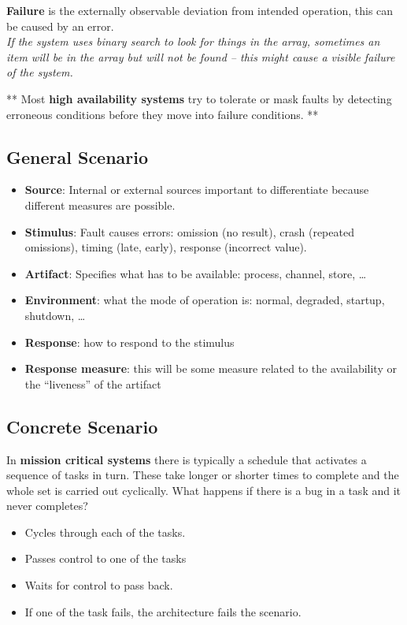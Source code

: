 \documentclass[a4paper]{article}
\begin{document}
\textbf{Failure} is the externally observable deviation from intended operation, this can be caused by an error.\\
\textit{If the system uses binary search to look for things in the array, sometimes an item will be in the array but will not be found – this might cause a visible failure  of the system.}


** Most \textbf{high availability systems} try to tolerate or mask faults by detecting erroneous conditions before they move into failure conditions. **


\subsection{General Scenario}

\begin{itemize}
\item{\textbf{Source}: Internal or external sources important to differentiate because different measures are possible.}
\item{\textbf{Stimulus}: Fault causes errors: omission (no result), crash (repeated omissions), timing (late, early), response (incorrect value).}
\item{\textbf{Artifact}: Specifies what has to be available: process, channel, store, …}
\item{\textbf{Environment}: what the mode of operation is: normal, degraded, startup, shutdown, …}
\item{\textbf{Response}:  how to respond to the stimulus }
\item{\textbf{Response measure}: this will be some measure related to the availability or the “liveness” of the artifact}
\end{itemize}

\subsection{Concrete Scenario}

In \textbf{mission critical systems} there is typically a schedule that activates a sequence of tasks in turn.  These take longer or shorter times to complete and the whole set is carried out cyclically. What happens if there is a bug in a task and it never completes?

\begin{itemize}
\item{Cycles through each of the tasks.}
\item{Passes control to one of the tasks}
\item{Waits for control to pass back.}
\item{If one of the task fails, the architecture fails the scenario.}
\end{itemize}
\end{document}
